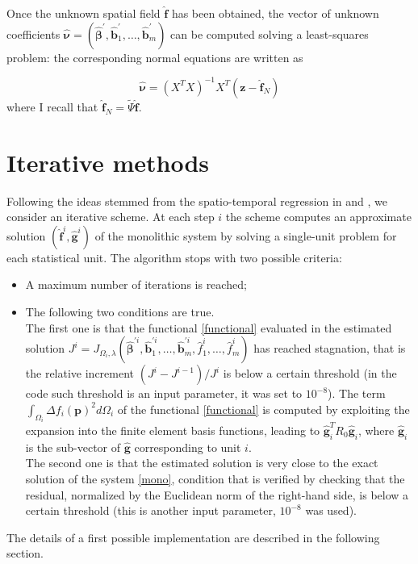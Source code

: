 Once the unknown spatial field $\hat{\bm{f}}$ has been obtained, the vector of unknown coefficients $\hat{\bm{\nu}} = (\hat{\bm{\beta}}^\prime, \hat{\bm{b}}_1^\prime, \dots, \hat{\bm{b}}_m^\prime)$ can be computed solving a least-squares problem: the corresponding normal equations are written as
    
\begin{equation}
    \label{nu}
    \hat{\bm{\nu}} = \left(X^TX\right)^{-1}X^T\left(\bm{z} - \hat{\bm{f}}_N\right)
\end{equation}
where I recall that $\hat{\bm{f}}_N = \tilde{\Psi} \hat{\bm{f}}$.

\section{Iterative methods}

Following the ideas stemmed from the spatio-temporal regression in \citeauthor{pollini} \cite{pollini} and \citeauthor{massardi} \cite{massardi}, we consider an iterative scheme. At each step $i$ the scheme computes an approximate solution $(\hat{\mathbf{f}}^{i},\hat{\mathbf{g}}^{i})$ of the monolithic system by solving a single-unit problem for each statistical unit.
The algorithm stops with two possible criteria:
\begin{itemize}
    \item A maximum number of iterations is reached;
    \item The following two conditions are true. \\
    The first one is that the functional \ref{functional} evaluated in the estimated solution $J^i = J_{\Omega_i, \lambda}\left( \hat{\bm{\beta}}^{\prime i}, \hat{\bm{b}}^{\prime i}_1, \dots, \hat{\bm{b}}^{\prime i}_m, \hat{f}_1^i, \dots, \hat{f}_m^i \right)$ has reached stagnation, that is the relative increment $\left( J^i - J^{i-1}\right) / J^i$ is below a certain threshold (in the code such threshold is an input parameter, it was set to $10^{-8}$). The term $ \int_{\Omega_i} \Delta f_i \left(\bm{p}\right)^2 d\Omega_i $ of the functional \ref{functional} is computed by exploiting the expansion into the finite element basis functions, leading to $\hat{\bm{g}}_i^T R_0 \hat{\bm{g}}_i$, where $\hat{\bm{g}}_i $ is the sub-vector of $\hat{\bm{g}}$ corresponding to unit $i$.\\
    The second one is that the estimated solution is very close to the exact solution of the system \ref{mono}, condition that is verified by checking that the residual, normalized by the Euclidean norm of the right-hand side, is below a certain threshold (this is another input parameter, $10^{-8}$ was used).
\end{itemize}
The details of a first possible implementation are described in the following section.

